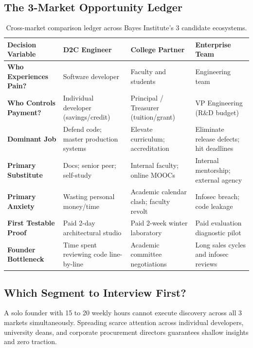 \subsection{The 3-Market Opportunity Ledger}

\begin{table}[t]
\centering
\small
\begin{tabularx}{\textwidth}{>{\RaggedRight\bfseries}p{3.2cm} >{\RaggedRight}X >{\RaggedRight}X >{\RaggedRight}X}
\toprule
Decision Variable & D2C Engineer & College Partner & Enterprise Team \\
\midrule
Who Experiences Pain? & Software developer & Faculty and students & Engineering team \\
\addlinespace
Who Controls Payment? & Individual developer (savings/credit) & Principal / Treasurer (tuition/grant) & VP Engineering (R\&D budget) \\
\addlinespace
Dominant Job & Defend code; master production systems & Elevate curriculum; accreditation & Eliminate release defects; hit deadlines \\
\addlinespace
Primary Substitute & Docs; senior peer; self-study & Internal faculty; online MOOCs & Internal mentorship; external agency \\
\addlinespace
Primary Anxiety & Wasting personal money/time & Academic calendar clash; faculty revolt & Infosec breach; code leakage \\
\addlinespace
First Testable Proof & Paid 2-day architectural studio & Paid 2-week winter laboratory & Paid evaluation diagnostic pilot \\
\addlinespace
Founder Bottleneck & Time spent reviewing code line-by-line & Academic committee negotiations & Long sales cycles and infosec reviews \\
\bottomrule
\end{tabularx}
\caption{Cross-market comparison ledger across Bayes Institute's 3 candidate ecosystems.}
\label{tab:ch6_three_market_ledger}
\end{table}

\subsection{Which Segment to Interview First?}

A solo founder with 15 to 20 weekly hours cannot execute discovery across all 3 markets simultaneously. Spreading scarce attention across individual developers, university deans, and corporate procurement directors guarantees shallow insights and zero traction.

